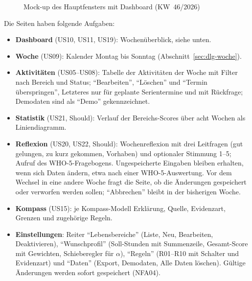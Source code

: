 \begin{figure}[H]
  \caption{Mock-up des Hauptfensters mit Dashboard (\ac{KW}~46/2026)}\label{abb:mockup-haupt}
  \centering
\end{figure}

Die Seiten haben folgende Aufgaben:
\begin{itemize}
  \item \textbf{Dashboard} (US10, US11, US19): Wochenüberblick, siehe unten.
  \item \textbf{Woche} (US09): Kalender Montag bis Sonntag (Abschnitt~\ref{sec:dlg-woche}).
  \item \textbf{Aktivitäten} (US05--US08): Tabelle der Aktivitäten der Woche mit Filter nach Bereich und Status; \enquote{Bearbeiten}, \enquote{Löschen} und \enquote{Termin überspringen}, Letzteres nur für geplante Serientermine und mit Rückfrage; Demodaten sind als \enquote{Demo} gekennzeichnet.
  \item \textbf{Statistik} (US21, Should): Verlauf der Bereichs-Scores über acht Wochen als Liniendiagramm.
  \item \textbf{Reflexion} (US20, US22, Should): Wochenreflexion mit drei Leitfragen (gut gelungen, zu kurz gekommen, Vorhaben) und optionaler Stimmung 1--5; Aufruf des WHO-5-Fragebogens. Ungespeicherte Eingaben bleiben erhalten, wenn sich Daten ändern, etwa nach einer WHO-5-Auswertung. Vor dem Wechsel in eine andere Woche fragt die Seite, ob die Änderungen gespeichert oder verworfen werden sollen; \enquote{Abbrechen} bleibt in der bisherigen Woche.
  \item \textbf{Kompass} (US15): je Kompass-Modell Erklärung, Quelle, Evidenzart, Grenzen und zugehörige Regeln.
  \item \textbf{Einstellungen}: Reiter \enquote{Lebensbereiche} (Liste, Neu, Bearbeiten, Deaktivieren), \enquote{Wunschprofil} (Soll-Stunden mit Summenzeile, Gesamt-Score mit Gewichten, Schieberegler für $\alpha$), \enquote{Regeln} (R01--R10 mit Schalter und Evidenzart) und \enquote{Daten} (Export, Demodaten, Alle Daten löschen). Gültige Änderungen werden sofort gespeichert (NFA04).
\end{itemize}


